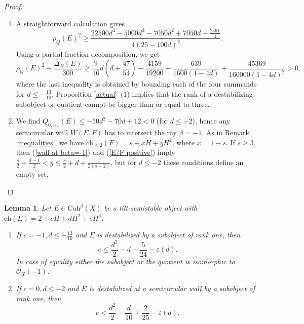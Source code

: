 \documentclass{amsart}
\newtheorem{lemma}[theorem]{Lemma}
\begin{document}
	\begin{proof}\begin{enumerate}
	\item A straightforward calculation gives $$\rho_Q(E)^2\ge\frac{22500d^4-5000d^3-7050d^2+7050d-\frac{2491}{4}}{4(25-100d)^2}.$$ 
	Using a partial fraction decomposition, we get
	$$\rho_Q(E)^2-\frac{\overline{\Delta}_H(E)}{300}\ge\frac{9}{16}d\left(d+\frac{47}{54}\right)-\frac{4159}{19200}-\frac{639}{1600(1-4d)}+\frac{45369}{160000(1-4d)^2}>0,$$
		where the last inequality is obtained by bounding each of the four summands for $d\le-\frac{13}{10}$. Proposition \ref{actual}~(1) implies that the rank of a destabilizing subobject or quotient cannot be bigger than or equal to three.
		\item We find $Q_{0,-1}(E)\le-50d^2-70d+12<0$ (for $d\le-2$), hence any semicircular wall $W(E,F)$ has to intersect the ray $\beta=-1$. As in Remark \ref{inequalities}, we have $\mathrm{ch}_{\le 2}(F)=s+xH+yH^2$, where $x=1-s$. If $s\ge 3$, then (\ref{wall at beta=-1}) and (\ref{E/F positive}) imply $\frac s2+\frac{d-1}{2}<y\le\frac s2+d+\frac{1}{2(s-2)}$, but for $d\le-2$ these conditions define an empty set.
		\end{enumerate}
	\end{proof}
	
	\begin{lemma}\label{one}Let $E\in\mathrm{Coh}^\beta(X)$ be a tilt-semistable object with $\mathrm{ch}(E)=2+cH+dH^2+eH^3$.
		\begin{enumerate}
			\item If $c=-1,d\le-\frac{13}{10}$ and $E$ is destabilized by a subobject of rank one, then
			$$e\le\frac{d^2}{2}-d+\frac{5}{24}-\varepsilon(d).$$
			In case of equality either the subobject or the quotient is isomorphic to $\mathcal O_X(-1)$.
			\item If $c=0,d\le -2$ and $E$ is destabilized at a semicircular wall by a subobject of rank one, then
			$$e<\frac{d^2}{2}-\frac{d}{10}+\frac{2}{25}-\varepsilon(d).$$
		\end{enumerate}
	\end{lemma}
	
\end{document}
